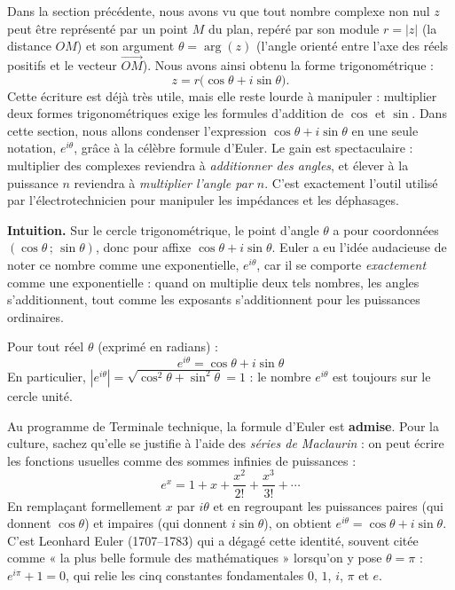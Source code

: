 \documentclass[11pt]{article}
\newcommand{\cle}[1]{{\popxbold\color{popdark}#1}}
\newcounter{popsec}
\newcounter{popsub}
\newcommand{\courssub}[1]{%
  \stepcounter{popsub}%
  \par\vspace{9pt}\noindent{\popxbold\fontsize{11.5}{13}\selectfont\color{popink}{\color{poporange}\thepopsec.\thepopsub}\hspace{6pt}#1}\par\nopagebreak\vspace{4pt}
}
\begin{document}
Dans la section précédente, nous avons vu que tout nombre complexe non nul $z$ peut être représenté par un point $M$ du plan, repéré par son \cle{module} $r = |z|$ (la distance $OM$) et son \cle{argument} $\theta = \arg(z)$ (l'angle orienté entre l'axe des réels positifs et le vecteur $\overrightarrow{OM}$). Nous avons ainsi obtenu la \cle{forme trigonométrique} :
\[ z = r\bigl(\cos\theta + i\sin\theta\bigr). \]
Cette écriture est déjà très utile, mais elle reste lourde à manipuler : multiplier deux formes trigonométriques exige les formules d'addition de $\cos$ et $\sin$. Dans cette section, nous allons condenser l'expression $\cos\theta + i\sin\theta$ en une seule notation, $e^{i\theta}$, grâce à la célèbre \cle{formule d'Euler}. Le gain est spectaculaire : multiplier des complexes reviendra à \emph{additionner des angles}, et élever à la puissance $n$ reviendra à \emph{multiplier l'angle par $n$}. C'est exactement l'outil utilisé par l'électrotechnicien pour manipuler les impédances et les déphasages.

\courssub{La formule d'Euler}

\textbf{Intuition.} Sur le cercle trigonométrique, le point d'angle $\theta$ a pour coordonnées $(\cos\theta\,;\,\sin\theta)$, donc pour affixe $\cos\theta + i\sin\theta$. Euler a eu l'idée audacieuse de noter ce nombre comme une exponentielle, $e^{i\theta}$, car il se comporte \emph{exactement} comme une exponentielle : quand on multiplie deux tels nombres, les angles s'additionnent, tout comme les exposants s'additionnent pour les puissances ordinaires.

\begin{propriete}
Pour tout réel $\theta$ (exprimé en radians) :
\[ \boxed{\ e^{i\theta} = \cos\theta + i\sin\theta\ } \]
En particulier, $|e^{i\theta}| = \sqrt{\cos^2\theta + \sin^2\theta} = 1$ : le nombre $e^{i\theta}$ est toujours sur le \cle{cercle unité}.
\end{propriete}

\begin{savaistu}
Au programme de Terminale technique, la formule d'Euler est \textbf{admise}. Pour la culture, sachez qu'elle se justifie à l'aide des \emph{séries de Maclaurin} : on peut écrire les fonctions usuelles comme des sommes infinies de puissances :
\[ e^{x} = 1 + x + \frac{x^2}{2!} + \frac{x^3}{3!} + \cdots \]
En remplaçant formellement $x$ par $i\theta$ et en regroupant les puissances paires (qui donnent $\cos\theta$) et impaires (qui donnent $i\sin\theta$), on obtient $e^{i\theta} = \cos\theta + i\sin\theta$. C'est Leonhard Euler (1707--1783) qui a dégagé cette identité, souvent citée comme « la plus belle formule des mathématiques » lorsqu'on y pose $\theta = \pi$ : $e^{i\pi} + 1 = 0$, qui relie les cinq constantes fondamentales $0$, $1$, $i$, $\pi$ et $e$.
\end{savaistu}
\end{document}
